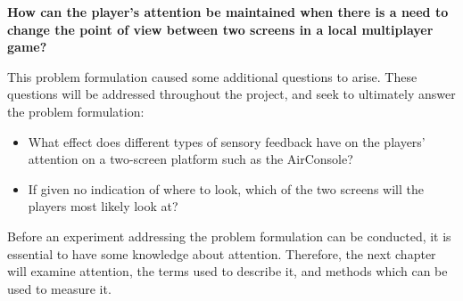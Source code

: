 \begin{changemargin}{1cm}{1cm}
\textbf{How can the player’s attention be maintained when there is a need to change the point of view between two screens in a local multiplayer game?}
\end{changemargin}

This problem formulation caused some additional questions to arise. These questions will be addressed throughout the project, and seek to ultimately answer the problem formulation:
\begin{itemize}
\item What effect does different types of sensory feedback have on the players' attention on a two-screen platform such as the AirConsole?
\item If given no indication of where to look, which of the two screens will the players most likely look at?
\end{itemize}

Before an experiment addressing the problem formulation can be conducted, it is essential to have some knowledge about attention. Therefore, the next chapter will examine attention, the terms used to describe it, and methods which can be used to measure it.
